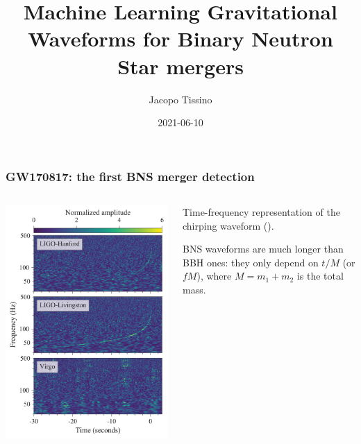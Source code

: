 \documentclass{beamer}
\title{Machine Learning Gravitational Waveforms for Binary Neutron Star mergers}
\author{Jacopo Tissino}
\date{2021-06-10}
\begin{document}
\frame{\titlepage}

\begin{frame}
    \frametitle{GW170817: the first BNS merger detection}
    \begin{columns}
        
    \begin{column}{0.5\textwidth}
    \includegraphics[width=\textwidth]{figures/836px-GW170817_spectrograms.svg.png}
    \end{column}

    \begin{column}{0.5\textwidth}
    Time-frequency representation of the chirping waveform
    (\cite[]{abbottGW170817ObservationGravitational2017}).

    BNS waveforms are much longer than BBH ones: they only depend on \(t/M \) (or \(fM\)), where \(M = m_1 + m_2 \) is the total mass.
    \end{column}
    \end{columns}
\end{frame}
\end{document}
